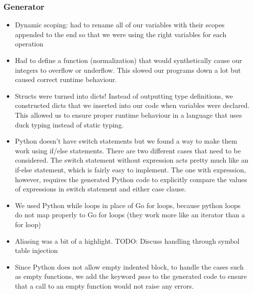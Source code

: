 \documentclass{article}
\begin{document}

\subsubsection{Generator}
\begin{itemize}
\item Dynamic scoping: had to rename all of our variables with their scopes appended to the end so that we were using the right variables for each operation
\item Had to define a function (normalization) that would synthetically cause our integers to overflow or underflow. This slowed our programs down a lot but caused correct runtime behaviour.
\item Structs were turned into dicts! Instead of outputting type definitions, we constructed dicts that we inserted into our code when variables were declared. This allowed us to ensure proper runtime behaviour in a language that uses duck typing instead of static typing.
\item Python doesn't have switch statements but we found a way to make them work using if/else statements. There are two different cases that need to be considered. The switch statement without expression acts pretty much like an if-else statement, which is fairly easy to implement. The one with expression, however, requires the generated Python code to explicitly compare the values of expressions in switch statement and either case clause.
\item We used Python while loops in place of Go for loops, because python loops do not map properly to Go for loops (they work more like an iterator than a for loop)
\item Aliasing was a bit of a highlight. TODO: Discuss handling through symbol table injection
\item Since Python does not allow empty indented block, to handle the
cases such as empty functions, we add the keyword \textit{pass} to the
generated code to ensure that a call to an empty function would not
raise any errors.
\end{itemize}
\end{document}
